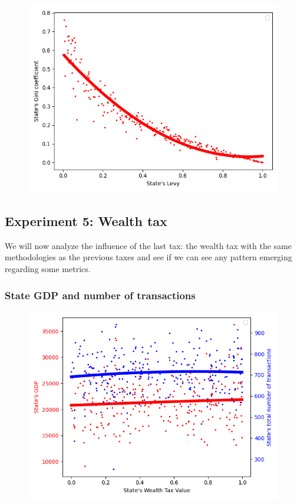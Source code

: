 {{{{{        \begin{figure}
            \includegraphics[width=\linewidth]{img/exp/4_3.png}
        \end{figure} 
        { \lipsum[1-2] %
        \par


    \subsection{Experiment 5: Wealth tax}
    We will now analyze the influence of the last tax: the wealth tax with the same methodologies as the previous taxes and see if we can see any pattern emerging regarding some metrics. 

        \subsubsection{State GDP and number of transactions}

        \begin{figure}
            \includegraphics[width=\linewidth]{img/exp/5_1.png}
        \end{figure} 
        { \lipsum[1-2] %
        \par

}}}}}}}

